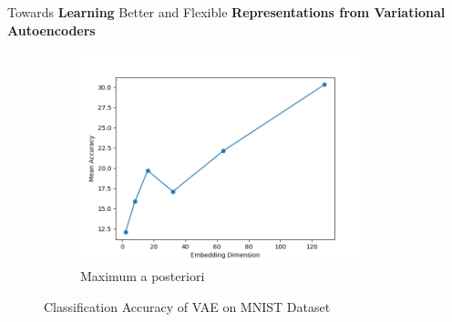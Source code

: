 \documentclass[hyperref={colorlinks,citecolor=blue,linkcolor=blue,urlcolor=blue}]{beamer}
\begin{document}
\begin{frame}{ Towards \textbf{Learning} Better and Flexible \textbf{Representations from Variational Autoencoders} \vspace{0.3em}}
\begin{figure}
\begin{subfigure}[b]{0.4\textwidth}
        \includegraphics[width=0.9\textwidth]{./Images/MNIST_VAE_MAP.png}
        \caption{Maximum a posteriori}
    \end{subfigure}
    \caption{Classification Accuracy of VAE on MNIST Dataset}
  \end{figure}
\end{frame}
\end{document}
